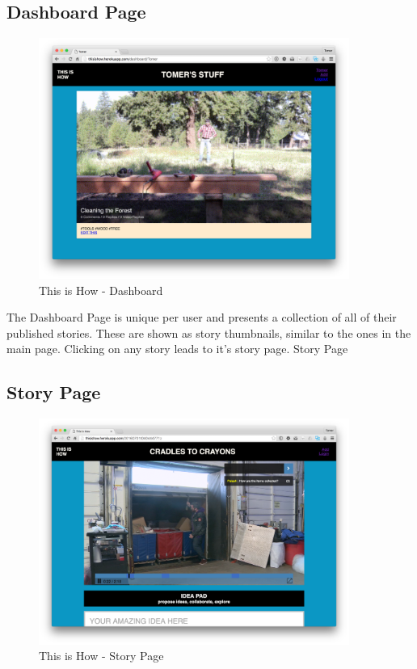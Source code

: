 \subsection{Dashboard Page}

   \begin{figure}[thpb]
      \centering
      \includegraphics[width=4in]{figures/dashboard.png}
      \caption{This is How - Dashboard}
      \label{fig_dashboard_page}
   \end{figure}

The Dashboard Page is unique per user and presents a collection of all of their published stories. These are shown as story thumbnails, similar to the ones in the main page. Clicking on any story leads to it's story page. 
Story Page

\subsection{Story Page}

   \begin{figure}[thpb]
      \centering
      \includegraphics[width=4in]{figures/storypage.png}
      \caption{This is How - Story Page}
      \label{fig_dashboard_page}
   \end{figure}


